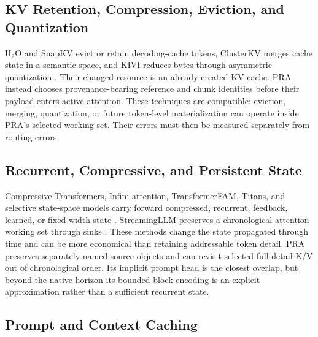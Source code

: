 \documentclass[11pt]{article}
\begin{document}
\subsection{KV Retention, Compression, Eviction, and Quantization}

H$_2$O and SnapKV evict or retain decoding-cache tokens, ClusterKV merges cache state in a
semantic space, and KIVI reduces bytes through asymmetric quantization
\cite{zhang2023h2o,li2024snapkv,liu2024clusterkv,liu2024kivi}. Their changed resource is an
already-created KV cache. PRA instead chooses provenance-bearing reference and chunk identities
before their payload enters active attention. These techniques are compatible: eviction,
merging, quantization, or future token-level materialization can operate inside PRA's selected
working set. Their errors must then be measured separately from routing errors.

\subsection{Recurrent, Compressive, and Persistent State}

Compressive Transformers, Infini-attention, TransformerFAM, Titans, and selective state-space
models carry forward compressed, recurrent, feedback, learned, or fixed-width state
\cite{rae2020compressive,munkhdalai2024infini,hwang2024fam,behrouz2025titans,gu2024mamba}.
StreamingLLM preserves a chronological attention working set through sinks
\cite{xiao2023streamingllm}. These methods change the state propagated through time and can be
more economical than retaining addressable token detail. PRA preserves separately named source
objects and can revisit selected full-detail K/V out of chronological order. Its implicit prompt
head is the closest overlap, but beyond the native horizon its bounded-block encoding is an
explicit approximation rather than a sufficient recurrent state.

\subsection{Prompt and Context Caching}
\end{document}
